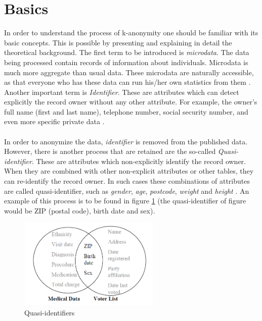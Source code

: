 \documentclass{llncs}
\begin{document}
\section{Basics}
In order to understand the process of k-anonymity one should be familiar with its basic concepts. This is possible by presenting and explaining in detail the theoretical background.  The first term to be introduced is \textit{microdata}. The data being processed contain records of information about individuals. Microdata is much more aggregate than usual data. These microdata are naturally accessible, as that everyone who has these data can run his/her own statistics from them  \cite{microdataweb}. 
Another important term is \textit{Identifier}. These are attributes which can detect explicitly the record owner without any other attribute. For example, the owner’s full name (first and last name), telephone number, social security number, and even more specific private data \cite{domingo2008critique}.\\\\
In order to anonymize the data, \textit{identifier} is removed from the published data. However, there is another process that are retained are the so-called \textit{Quasi-identifier}. These are attributes which non-explicitly identify the record owner. When they are combined with other non-explicit attributes or other tables, they can re-identify the record owner. In such cases these combinations of attributes are called quasi-identifier, such as \textit{gender}, \textit{age}, \textit{postcode}, \textit{weight} and \textit{height} \cite{dalenius1986finding}. An example of this process is to be found in figure \ref{quasiidentifier} (the quasi-identifier of figure would be ZIP (postal code), birth date and sex).\\
\begin{figure}[]
	\centering
	\includegraphics[width=0.6\textwidth]{linkingdata.png}
	\caption{Quasi-identifiers \cite{sweeney2002k}}%
	\label{quasiidentifier}
\end{figure}\\
\end{document}
